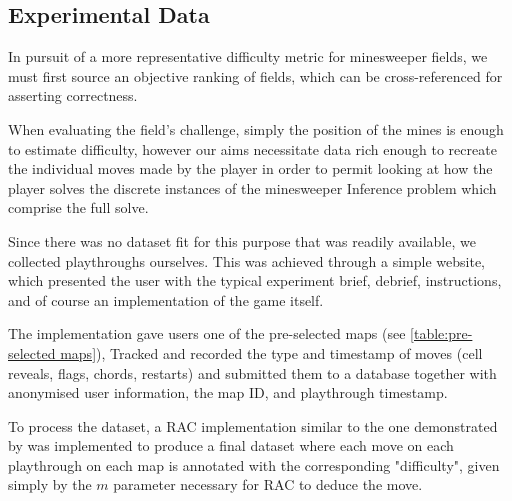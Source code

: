 
\subsection{Experimental Data}
    In pursuit of a more representative difficulty metric for minesweeper fields, we must first source an objective ranking of fields, which can be cross-referenced for asserting correctness.
    
    When evaluating the field's challenge, simply the position of the mines is enough to estimate difficulty, however our aims necessitate data rich enough to recreate the individual moves made by the player in order to permit looking at how the player solves the discrete instances of the minesweeper Inference problem which comprise the full solve.
    
    Since there was no dataset fit for this purpose that was readily available, we collected playthroughs ourselves. This was achieved through a simple website, which presented the user with the typical experiment brief, debrief, instructions, and of course an implementation of the game itself.
    
    The implementation gave users one of the pre-selected maps (see \cref{table:pre-selected maps}), Tracked and recorded the type and timestamp of moves (cell reveals, flags, chords, restarts) and submitted them to a database together with anonymised user information, the map ID, and playthrough timestamp.
    
    To process the dataset, a RAC implementation similar to the one demonstrated by \citet{minesweeperNConsistencyAssist} was implemented to produce a final dataset where each move on each playthrough on each map is annotated with the corresponding "difficulty", given simply by the $m$ parameter necessary for RAC to deduce the move.
    

